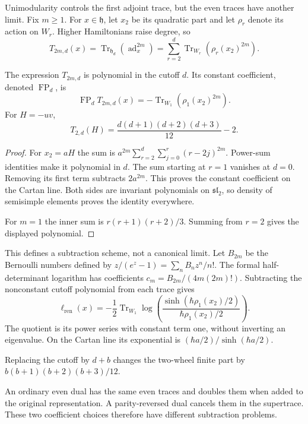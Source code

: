 Unimodularity controls the first adjoint trace, but the even traces
have another limit. Fix $m\geq1$. For $x\in\mathfrak h$, let $x_2$ be its
quadratic part and let $\rho_r$ denote its action on $W_r$.
Higher Hamiltonians raise degree, so
\[
 T_{2m,d}(x)=\operatorname{Tr}_{\mathfrak h_d}
       (\operatorname{ad}_x^{2m})
    =\sum_{r=2}^d\operatorname{Tr}_{W_r}(\rho_r(x_2)^{2m}).
\]

\begin{proposition}\label{mht:prop:hamiltonian-even-traces}
The expression $T_{2m,d}$ is polynomial in the cutoff $d$.
Its constant coefficient, denoted $\operatorname{FP}_d$, is
\[
 \operatorname{FP}_dT_{2m,d}(x)
      =-\operatorname{Tr}_{W_1}(\rho_1(x_2)^{2m}).
\]
For $H=-uv$,
\[
 T_{2,d}(H)=\frac{d(d+1)(d+2)(d+3)}{12}-2.
\]
\end{proposition}

\begin{proof}
For $x_2=aH$ the sum is
$a^{2m}\sum_{r=2}^d\sum_{j=0}^r(r-2j)^{2m}$.
Power-sum identities make it polynomial in $d$.
The sum starting at $r=1$ vanishes at $d=0$. Removing its first
term subtracts $2a^{2m}$. This proves the constant coefficient
on the Cartan line. Both sides are invariant polynomials on
$\mathfrak{sl}_2$, so density of semisimple elements proves
the identity everywhere.

For $m=1$ the inner sum is $r(r+1)(r+2)/3$.
Summing from $r=2$ gives the displayed polynomial.
\end{proof}

This defines a subtraction scheme, not a canonical limit.
Let $B_{2m}$ be the Bernoulli numbers defined by
$z/(e^z-1)=\sum_n B_nz^n/n!$. The formal half-determinant
logarithm has coefficients
$c_m=B_{2m}/(4m(2m)!)$. Subtracting the nonconstant cutoff
polynomial from each trace gives
\[
 \ell_{\mathrm{ren}}(x)
 =-\frac12\operatorname{Tr}_{W_1}
  \log\!\left(
   \frac{\sinh(\hbar\rho_1(x_2)/2)}{\hbar\rho_1(x_2)/2}
       \right).
\]
The quotient is its power series with constant term one, without
inverting an eigenvalue. On the Cartan line its exponential is
$(\hbar a/2)/\sinh(\hbar a/2)$.

Replacing the cutoff by $d+b$ changes the two-wheel finite part
by $b(b+1)(b+2)(b+3)/12$.

An ordinary even dual has the same even traces and doubles them
when added to the original representation. A parity-reversed
dual cancels them in the supertrace. These two coefficient
choices therefore have different subtraction problems.

